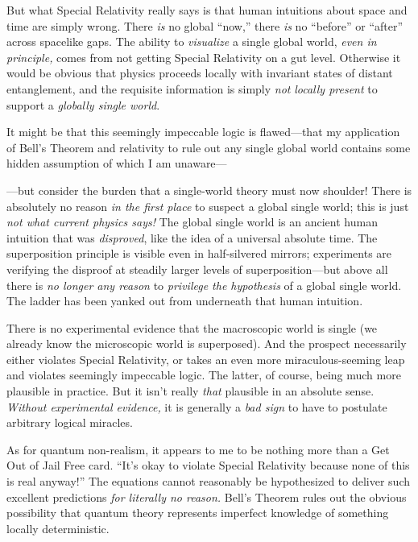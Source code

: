{
 But what Special Relativity really says is that human intuitions
about space and time are simply wrong. There \textit{is} no global
``now,'' there \textit{is} no
``before'' or
``after'' across spacelike gaps. The
ability to \textit{visualize} a single global world, \textit{even in
principle,} comes from not getting Special Relativity on a gut level.
Otherwise it would be obvious that physics proceeds locally with
invariant states of distant entanglement, and the requisite information
is simply \textit{not} \textit{locally present} to support a
\textit{globally single world}.}

{
 It might be that this seemingly impeccable logic is flawed---that
my application of Bell's Theorem and relativity to rule
out any single global world contains some hidden assumption of which I
am unaware---}

{
 {}---but consider the burden that a single-world theory must now
shoulder! There is absolutely no reason \textit{in the first place} to
suspect a global single world; this is just \textit{not what current
physics says!} The global single world is an ancient human intuition
that was \textit{disproved}, like the idea of a universal absolute
time. The superposition principle is visible even in half-silvered
mirrors; experiments are verifying the disproof at steadily larger
levels of superposition---but above all there is \textit{no longer any
reason} to \textit{privilege the hypothesis} of a global single world.
The ladder has been yanked out from underneath that human intuition.}

{
 There is no experimental evidence that the macroscopic world is
single (we already know the microscopic world is superposed). And the
prospect necessarily either violates Special Relativity, or takes an
even more miraculous-seeming leap and violates seemingly impeccable
logic. The latter, of course, being much more plausible in practice.
But it isn't really \textit{that} plausible in an
absolute sense. \textit{Without experimental evidence,} it is generally
a \textit{bad sign} to have to postulate arbitrary logical miracles.}

{
 As for quantum non-realism, it appears to me to be nothing more
than a Get Out of Jail Free card.
``It's okay to violate Special
Relativity because none of this is real anyway!'' The
equations cannot reasonably be hypothesized to deliver such excellent
predictions \textit{for literally no reason.} Bell's
Theorem rules out the obvious possibility that quantum theory
represents imperfect knowledge of something locally deterministic.}


